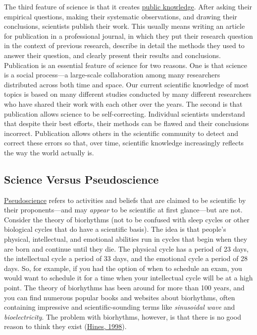 \documentclass[
]{krantz}
\begin{document}
The third feature of science is that it creates \protect\hyperlink{public-knowledge}{public knowledge}. After asking their empirical questions, making their systematic observations, and drawing their conclusions, scientists publish their work. This usually means writing an article for publication in a professional journal, in which they put their research question in the context of previous research, describe in detail the methods they used to answer their question, and clearly present their results and conclusions. Publication is an essential feature of science for two reasons. One is that science is a social process---a large-scale collaboration among many researchers distributed across both time and space. Our current scientific knowledge of most topics is based on many different studies conducted by many different researchers who have shared their work with each other over the years. The second is that publication allows science to be self-correcting. Individual scientists understand that despite their best efforts, their methods can be flawed and their conclusions incorrect. Publication allows others in the scientific community to detect and correct these errors so that, over time, scientific knowledge increasingly reflects the way the world actually is.

\hypertarget{science-versus-pseudoscience}{%
\subsection*{Science Versus Pseudoscience}\label{science-versus-pseudoscience}}


\protect\hyperlink{pseudoscience}{Pseudoscience} refers to activities and beliefs that are claimed to be scientific by their proponents---and may \emph{appear} to be scientific at first glance---but are not. Consider the theory of biorhythms (not to be confused with sleep cycles or other biological cycles that do have a scientific basis). The idea is that people's physical, intellectual, and emotional abilities run in cycles that begin when they are born and continue until they die. The physical cycle has a period of 23 days, the intellectual cycle a period of 33 days, and the emotional cycle a period of 28 days. So, for example, if you had the option of when to schedule an exam, you would want to schedule it for a time when your intellectual cycle will be at a high point. The theory of biorhythms has been around for more than 100 years, and you can find numerous popular books and websites about biorhythms, often containing impressive and scientific-sounding terms like \emph{sinusoidal wave} and \emph{bioelectricity}. The problem with biorhythms, however, is that there is no good reason to think they exist (\protect\hyperlink{ref-hines1998comprehensive}{Hines, 1998}).
\end{document}
